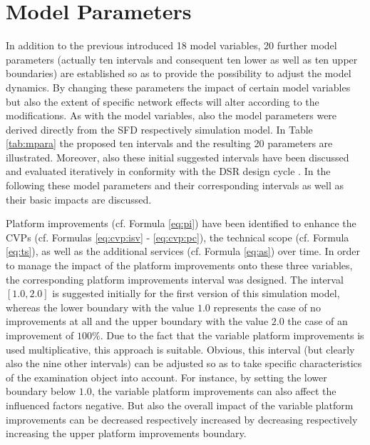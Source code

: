 \section{Model Parameters}\label{ch:sfd:mp}

In addition to the previous introduced 18 model variables, 20 further model parameters (actually ten intervals and consequent ten lower as well as ten upper boundaries) are established so as to provide the possibility to adjust the model dynamics. By changing these parameters the impact of certain model variables but also the extent of specific network effects will alter according to the modifications. As with the model variables, also the model parameters were derived directly from the \ac{SFD} respectively simulation model. In Table \ref{tab:mpara} the proposed ten intervals and the resulting 20 parameters are illustrated. Moreover, also these initial suggested intervals have been discussed and evaluated iteratively in conformity with the \ac{DSR} design cycle \citep{Hevner2007}. In the following these model parameters and their corresponding intervals as well as their basic impacts are discussed.

Platform improvements (cf. Formula \ref{eq:pi}) have been identified to enhance the \acp{CVP} (cf. Formulas \ref{eq:cvp:isv} - \ref{eq:cvp:pc}), the technical scope (cf. Formula \ref{eq:ts}), as well as the additional services (cf. Formula \ref{eq:as}) over time. In order to manage the impact of the platform improvements onto these three variables, the corresponding platform improvements interval was designed. The interval $[1.0,2.0]$ is suggested initially for the first version of this simulation model, whereas the lower boundary with the value $1.0$ represents the case of no improvements at all and the upper boundary with the value $2.0$ the case of an improvement of $100\%$. Due to the fact that the variable platform improvements is used multiplicative, this approach is suitable. Obvious, this interval (but clearly also the nine other intervals) can be adjusted so as to take specific characteristics of the examination object into account. For instance, by setting the lower boundary below $1.0$, the variable platform improvements can also affect the influenced factors negative. But also the overall impact of the variable platform improvements can be decreased respectively increased by decreasing respectively increasing the upper platform improvements boundary.

